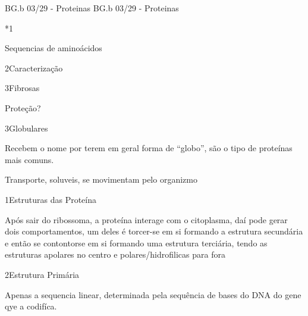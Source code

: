 \documentclass[\mainfilename]{subfiles}
\begin{document}
{BG.b 03/29 - Proteinas}
{BG.b 03/29 - Proteinas}

\begin{sectionBox}*1{}
    
    Sequencias de aminoácidos
    
\end{sectionBox}

\begin{sectionBox}2{Caracterização}
    
    
\end{sectionBox}

\begin{sectionBox}3{Fibrosas}
    
    Proteção?
    
\end{sectionBox}

\begin{sectionBox}3{Globulares}
    
    Recebem o nome por terem em geral forma de ``globo'', são o tipo de proteínas mais comuns.

    Transporte, soluveis, se movimentam pelo organizmo
    
\end{sectionBox}

\begin{sectionBox}1{Estruturas das Proteína}
    
    Após sair do ribossoma, a proteína interage com o citoplasma, daí pode gerar dois comportamentos, um deles é torcer-se em si formando a estrutura secundária e então se contontorse em si formando uma estrutura terciária, tendo as estruturas apolares no centro e polares/hidrofilicas para fora
    
\end{sectionBox}

\begin{sectionBox}2{Estrutura Primária}
    
    Apenas a sequencia linear, determinada pela sequência de bases do DNA do gene qye a codifíca.


    
    
\end{sectionBox}
\end{document}
